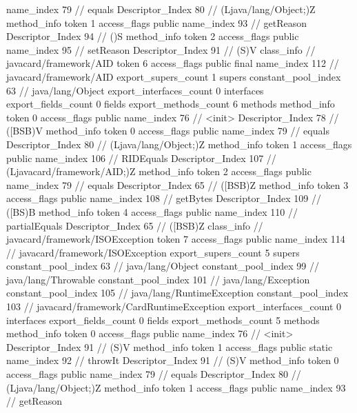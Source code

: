 {{{{{					name_index	79		// equals
					Descriptor_Index	80		// (Ljava/lang/Object;)Z
				}
				method_info {
					token	1
					access_flags	public
					name_index	93		// getReason
					Descriptor_Index	94		// ()S
				}
				method_info {
					token	2
					access_flags	public
					name_index	95		// setReason
					Descriptor_Index	91		// (S)V
				}
			}
		}
		class_info {		// javacard/framework/AID
			token	6
			access_flags	public final
			name_index	112		// javacard/framework/AID
			export_supers_count	1
			supers {
				constant_pool_index	63		// java/lang/Object
			}
			export_interfaces_count	0
			interfaces {
			}
			export_fields_count	0
			fields {
			}
			export_methods_count	6
			methods {
				method_info {
					token	0
					access_flags	public
					name_index	76		// <init>
					Descriptor_Index	78		// ([BSB)V
				}
				method_info {
					token	0
					access_flags	public
					name_index	79		// equals
					Descriptor_Index	80		// (Ljava/lang/Object;)Z
				}
				method_info {
					token	1
					access_flags	public
					name_index	106		// RIDEquals
					Descriptor_Index	107		// (Ljavacard/framework/AID;)Z
				}
				method_info {
					token	2
					access_flags	public
					name_index	79		// equals
					Descriptor_Index	65		// ([BSB)Z
				}
				method_info {
					token	3
					access_flags	public
					name_index	108		// getBytes
					Descriptor_Index	109		// ([BS)B
				}
				method_info {
					token	4
					access_flags	public
					name_index	110		// partialEquals
					Descriptor_Index	65		// ([BSB)Z
				}
			}
		}
		class_info {		// javacard/framework/ISOException
			token	7
			access_flags	public
			name_index	114		// javacard/framework/ISOException
			export_supers_count	5
			supers {
				constant_pool_index	63		// java/lang/Object
				constant_pool_index	99		// java/lang/Throwable
				constant_pool_index	101		// java/lang/Exception
				constant_pool_index	105		// java/lang/RuntimeException
				constant_pool_index	103		// javacard/framework/CardRuntimeException
			}
			export_interfaces_count	0
			interfaces {
			}
			export_fields_count	0
			fields {
			}
			export_methods_count	5
			methods {
				method_info {
					token	0
					access_flags	public
					name_index	76		// <init>
					Descriptor_Index	91		// (S)V
				}
				method_info {
					token	1
					access_flags	public static
					name_index	92		// throwIt
					Descriptor_Index	91		// (S)V
				}
				method_info {
					token	0
					access_flags	public
					name_index	79		// equals
					Descriptor_Index	80		// (Ljava/lang/Object;)Z
				}
				method_info {
					token	1
					access_flags	public
					name_index	93		// getReason
}}}}}
